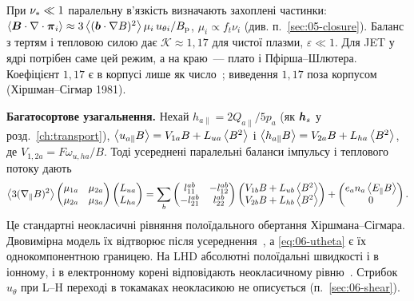 \begin{outofcorpus}
При $\nu_{*}\ll1$ паралельну в'язкість визначають захоплені частинки: $\left\langle \bm{B}\cdot\nabla\cdot\bm{\mathsf{\pi}}_i \right\rangle\approx3\left\langle (\bm{b}\cdot\nabla B)^2 \right\rangle\mu_i\,u_{\theta i}/B_{\mathrm{p}}$, $\mu_i\propto f_t\nu_i$ (див. п.~\ref{sec:05-closure}). Баланс з тертям і тепловою силою дає $\mathcal{K}\approx1{,}17$ для чистої плазми, $\varepsilon\ll1$. Для JET у ядрі потрібен саме цей режим, а на краю~--- плато і Пфірша--Шлютера. Коефіцієнт $1{,}17$ є в корпусі лише як число~\cite{Singh2004}; виведення $1{,}17$ поза корпусом (Хіршман--Сігмар 1981).
\end{outofcorpus}

\textbf{Багатосортове узагальнення.} Нехай $h_{a\parallel}=2Q_{a\parallel}/5p_a$ (як $\bm{h}_s$ у розд.~\ref{ch:transport}), $\left\langle u_{a\parallel}B \right\rangle=V_{1a}B+L_{ua}\left\langle B^2 \right\rangle$ і $\left\langle h_{a\parallel}B \right\rangle=V_{2a}B+L_{ha}\left\langle B^2 \right\rangle$, де $V_{1,2a}=F\omega_{u,ha}/B$. Тоді усереднені паралельні баланси імпульсу і теплового потоку дають~\cite[с.~7, рівн.~73--78]{Seto2014}
\begin{equation}\label{eq:06-seto78}
  \left\langle 3(\nabla_\parallel B)^2 \right\rangle
  \begin{pmatrix}\mu_{1a}&\mu_{2a}\\ \mu_{2a}&\mu_{3a}\end{pmatrix}
  \begin{pmatrix}L_{ua}\\ L_{ha}\end{pmatrix}
  =\sum_b\begin{pmatrix}l^{ab}_{11}&-l^{ab}_{12}\\ -l^{ab}_{21}&l^{ab}_{22}\end{pmatrix}
  \begin{pmatrix}V_{1b}B+L_{ub}\left\langle B^2 \right\rangle\\ V_{2b}B+L_{hb}\left\langle B^2 \right\rangle\end{pmatrix}
  +\begin{pmatrix}e_an_a\left\langle E_{\parallel} B \right\rangle\\ 0\end{pmatrix}.
\end{equation}
Це стандартні неокласичні рівняння полоїдального обертання Хіршмана--Сігмара. Двовимірна модель їх відтворює після усереднення~\cite{Seto2014}, а \eqref{eq:06-utheta} є їх однокомпонентною границею. На LHD абсолютні полоїдальні швидкості і в іонному, і в електронному корені відповідають неокласичному рівню~\cite{Ida2001}. Стрибок $u_\theta$ при L--H переході в токамаках неокласикою не описується (п.~\ref{sec:06-shear}).

